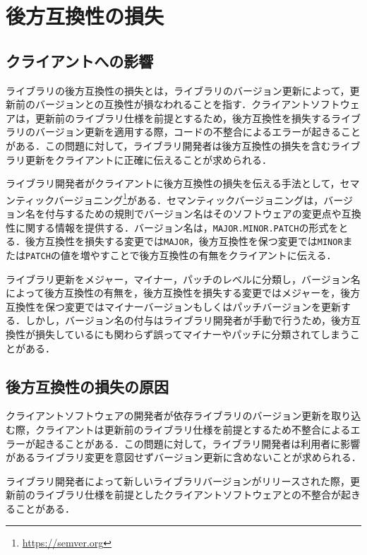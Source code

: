 \documentclass[11pt,dvipdfmx]{jreport}
\begin{document}
\chapter{後方互換性の損失}\label{chap:backward-compatibility}

\section{クライアントへの影響}
ライブラリの後方互換性の損失とは，ライブラリのバージョン更新によって，更新前のバージョンとの互換性が損なわれることを指す．クライアントソフトウェアは，更新前のライブラリ仕様を前提とするため，後方互換性を損失するライブラリのバージョン更新を適用する際，コードの不整合によるエラーが起きることがある．この問題に対して，ライブラリ開発者は後方互換性の損失を含むライブラリ更新をクライアントに正確に伝えることが求められる．

ライブラリ開発者がクライアントに後方互換性の損失を伝える手法として，セマンティックバージョニング\footnote{\url{https://semver.org}}がある．セマンティックバージョニングは，バージョン名を付与するための規則でバージョン名はそのソフトウェアの変更点や互換性に関する情報を提供する．バージョン名は，{\verb|MAJOR.MINOR.PATCH|}の形式をとる．後方互換性を損失する変更では{\verb|MAJOR|}，後方互換性を保つ変更では{\verb|MINOR|}または{\verb|PATCH|}の値を増やすことで後方互換性の有無をクライアントに伝える．

ライブラリ更新をメジャー，マイナー，パッチのレベルに分類し，バージョン名によって後方互換性の有無を，後方互換性を損失する変更ではメジャーを，後方互換性を保つ変更ではマイナーバージョンもしくはパッチバージョンを更新する．しかし，バージョン名の付与はライブラリ開発者が手動で行うため，後方互換性が損失しているにも関わらず誤ってマイナーやパッチに分類されてしまうことがある．



\section{後方互換性の損失の原因}
クライアントソフトウェアの開発者が依存ライブラリのバージョン更新を取り込む際，クライアントは更新前のライブラリ仕様を前提とするため不整合によるエラーが起きることがある．この問題に対して，ライブラリ開発者は利用者に影響があるライブラリ変更を意図せずバージョン更新に含めないことが求められる．

ライブラリ開発者によって新しいライブラリバージョンがリリースされた際，更新前のライブラリ仕様を前提としたクライアントソフトウェアとの不整合が起きることがある．
\end{document}
